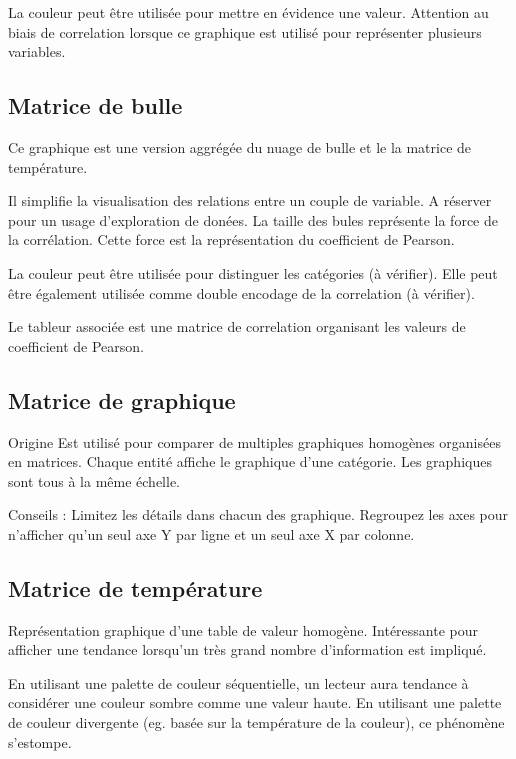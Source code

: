\documentclass[a4paper,12pt]{article}
\begin{document}
\begin{multicols}{2}
La couleur peut être utilisée pour mettre en évidence une valeur. \autocite{jonathanschwabishComparingCategories2021} Attention au biais de correlation lorsque ce graphique est utilisé pour représenter plusieurs variables. \autocite{jonathanschwabishComparingCategories2021}
\subsection*{Matrice de bulle}
\label{sec:orgbe3ad39}
Ce graphique est une version aggrégée du nuage de bulle et le la matrice de température.

Il simplifie la visualisation des relations entre un couple de variable. A réserver pour un usage d'exploration de donées. \autocite{sosulskiGraphics2019} La taille des bules représente la force de la corrélation. Cette force est la représentation du coefficient de Pearson. \autocite{jonathanschwabishRelationship2021}

La couleur peut être utilisée pour distinguer les catégories (à vérifier). Elle peut être également utilisée comme double encodage de la correlation (à vérifier).

Le tableur associée est une matrice de correlation organisant les valeurs de coefficient de Pearson.
\subsection*{Matrice de graphique}
\label{sec:org4b7bab9}
Origine
Est utilisé pour comparer de multiples graphiques homogènes organisées en matrices. Chaque entité affiche le graphique d'une catégorie. Les graphiques sont tous à la même échelle. \autocite{sosulskiGraphics2019}

Conseils : Limitez les détails dans chacun des graphique. \autocite{sosulskiGraphics2019} Regroupez les axes pour n'afficher qu'un seul axe Y par ligne et un seul axe X par colonne.
\subsection*{Matrice de température}
\label{sec:orga7d737c}
Représentation graphique d'une table de valeur homogène. \autocite{sosulskiGraphics2019}
Intéressante pour afficher une tendance lorsqu'un très grand nombre d'information est impliqué.

En utilisant une palette de couleur séquentielle, un lecteur aura tendance à considérer une couleur sombre comme une valeur haute. En utilisant une palette de couleur divergente (eg. basée sur la température de la couleur), ce phénomène s'estompe.


\end{multicols}
\end{document}
